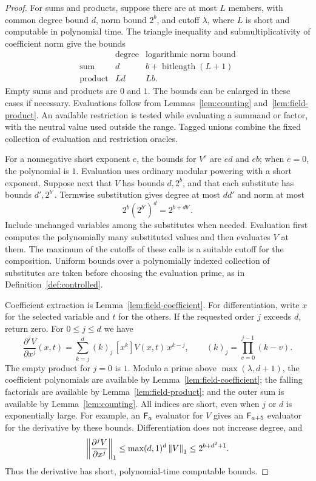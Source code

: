 \begin{proof}
For sums and products, suppose there are at most $L$ members, with
common degree bound $d$, norm bound $2^b$, and cutoff $\lambda$, where
$L$ is short and computable in polynomial time.  The triangle inequality
and submultiplicativity of coefficient norm give the bounds
\[
 \begin{array}{c|cc}
 &\text{degree}&\text{logarithmic norm bound}\\ \hline
 \text{sum}&d&b+\operatorname{bitlength}(L+1)\\
 \text{product}&Ld&Lb.
 \end{array}
\]
Empty sums and products are $0$ and $1$.  The bounds can be enlarged in
these cases if necessary.  Evaluations follow from
Lemmas~\ref{lem:counting} and~\ref{lem:field-product}.  An available
restriction is tested while evaluating a summand or factor, with the
neutral value used outside the range.  Tagged unions combine the fixed
collection of evaluation and restriction oracles.

For a nonnegative short exponent $e$, the bounds for $V^e$ are $ed$ and
$eb$; when $e=0$, the polynomial is $1$.  Evaluation uses ordinary
modular powering with a short exponent.  Suppose next that $V$ has
bounds $d,2^b$, and that each substitute has bounds $d',2^{b'}$.
Termwise substitution gives degree at most $dd'$ and norm at most
\[
 2^b(2^{b'})^d=2^{b+db'}.
\]
Include unchanged variables among the substitutes when needed.
Evaluation first computes the polynomially many substituted values and
then evaluates $V$ at them.  The maximum of the cutoffs of these calls
is a suitable cutoff for the composition.  Uniform bounds over a
polynomially indexed collection of substitutes are taken before choosing
the evaluation prime, as in Definition~\ref{def:controlled}.

Coefficient extraction is Lemma~\ref{lem:field-coefficient}.  For
differentiation, write $x$ for the selected variable and $t$ for the
others.  If the requested order $j$ exceeds $d$, return zero.  For
$0\le j\le d$ we have
\begin{equation}\label{eq:indexed-derivative}
 \frac{\partial^j V}{\partial x^j}(x,t)
 =\sum_{k=j}^d (k)_j\,[x^k]V(x,t)\,x^{k-j},
 \qquad (k)_j=\prod_{v=0}^{j-1}(k-v).
\end{equation}
The empty product for $j=0$ is $1$.  Modulo a prime above
$\max(\lambda,d+1)$, the coefficient polynomials are available by
Lemma~\ref{lem:field-coefficient}; the falling factorials are available
by Lemma~\ref{lem:field-product}; and the outer sum is available by
Lemma~\ref{lem:counting}.  All indices are short, even when $j$ or $d$
is exponentially large.  For example, an $\mathsf F_{a}$ evaluator for $V$
gives an $\mathsf F_{a+5}$ evaluator for the derivative by these bounds.
Differentiation does not increase degree, and
\[
 \left\|\frac{\partial^j V}{\partial x^j}\right\|_1
 \le\max(d,1)^d\left\lVert V\right\rVert_1
 \le 2^{b+d^2+1}.
\]
Thus the derivative has short, polynomial-time computable bounds.


\end{proof}
